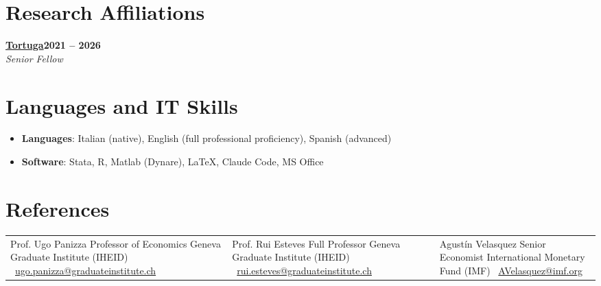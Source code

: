 \documentclass[letterpaper,11pt]{article}
\newcommand{\iconmail}{\faEnvelope\ }%
\newcommand{\iconmail}{}%
\newcommand{\cventry}[4]{%
    \textbf{#1}\hfill\textbf{#2}\\
    {\small\textit{#3}}\hfill{\small\textit{#4}}\par\vspace{5pt}}
\begin{document}
\section*{Research Affiliations}

\cventry{\href{https://www.tortuga-econ.it/}{Tortuga}}{2021 -- 2026}{Senior Fellow}{}

\section*{Languages and IT Skills}

\begin{itemize}[leftmargin=1.2em, itemsep=1pt, topsep=0pt, label=\textbullet]
    \item \textbf{Languages}: Italian (native), English (full professional proficiency), Spanish (advanced)
    \item \textbf{Software}: Stata, R, Matlab (Dynare), \LaTeX, Claude Code, MS Office
\end{itemize}

\section*{References}
\vspace{5pt}

\begin{tabular}{@{}p{}p{}p{}@{}}
Prof. Ugo Panizza\newline
Professor of Economics\newline
Geneva Graduate Institute (IHEID)\newline
\iconmail\href{mailto:ugo.panizza@graduateinstitute.ch}{ugo.panizza@graduateinstitute.ch}
&
Prof. Rui Esteves\newline
Full Professor\newline
Geneva Graduate Institute (IHEID)\newline
\iconmail\href{mailto:rui.esteves@graduateinstitute.ch}{rui.esteves@graduateinstitute.ch}
&
Agustín Velasquez\newline
Senior Economist\newline
International Monetary Fund (IMF)\newline
\iconmail\href{mailto:AVelasquez@imf.org}{AVelasquez@imf.org}
\\
\end{tabular}
\vspace{3pt}
\end{document}
